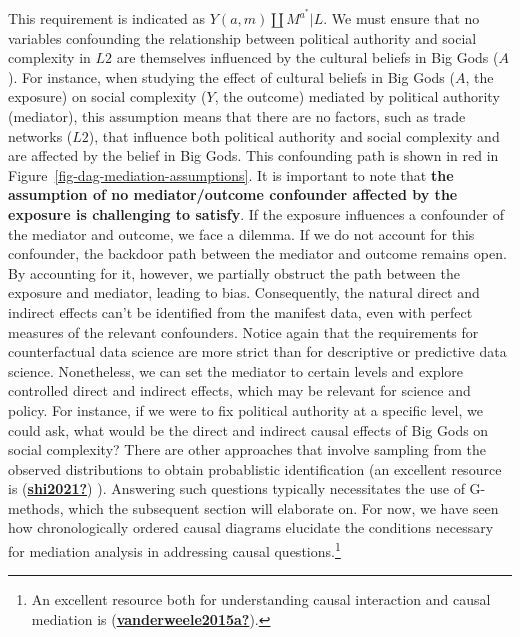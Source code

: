 \documentclass[
  singlecolumn]{report}
\begin{document}
This requirement is indicated as \(Y(a,m) \coprod M^{a^*} | L\). We must
ensure that no variables confounding the relationship between political
authority and social complexity in \(L2\) are themselves influenced by
the cultural beliefs in Big Gods (\(A\)). For instance, when studying
the effect of cultural beliefs in Big Gods (\(A\), the exposure) on
social complexity (\(Y\), the outcome) mediated by political authority
(mediator), this assumption means that there are no factors, such as
trade networks (\(L2\)), that influence both political authority and
social complexity and are affected by the belief in Big Gods. This
confounding path is shown in red in
Figure~\ref{fig-dag-mediation-assumptions}. It is important to note that
\textbf{the assumption of no mediator/outcome confounder affected by the
exposure is challenging to satisfy}. If the exposure influences a
confounder of the mediator and outcome, we face a dilemma. If we do not
account for this confounder, the backdoor path between the mediator and
outcome remains open. By accounting for it, however, we partially
obstruct the path between the exposure and mediator, leading to bias.
Consequently, the natural direct and indirect effects can't be
identified from the manifest data, even with perfect measures of the
relevant confounders. Notice again that the requirements for
counterfactual data science are more strict than for descriptive or
predictive data science. Nonetheless, we can set the mediator to certain
levels and explore controlled direct and indirect effects, which may be
relevant for science and policy. For instance, if we were to fix
political authority at a specific level, we could ask, what would be the
direct and indirect causal effects of Big Gods on social complexity?
There are other approaches that involve sampling from the observed
distributions to obtain probablistic identification (an excellent
resource is (\protect\hyperlink{ref-shi2021}{\textbf{shi2021?}}) ).
Answering such questions typically necessitates the use of G-methods,
which the subsequent section will elaborate on. For now, we have seen
how chronologically ordered causal diagrams elucidate the conditions
necessary for mediation analysis in addressing causal
questions.\footnote{An excellent resource both for understanding causal
  interaction and causal mediation is
  (\protect\hyperlink{ref-vanderweele2015a}{\textbf{vanderweele2015a?}}).}
\end{document}
